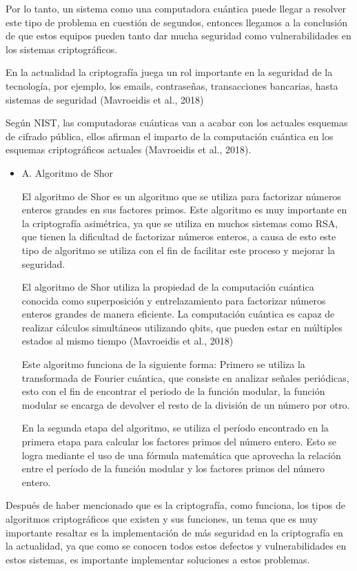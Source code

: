 \documentclass[twoside]{article}
\begin{document}
Por lo tanto, un sistema como una computadora cuántica puede llegar a resolver este tipo de problema en cuestión de segundos, entonces llegamos a la conclusión de que estos equipos pueden tanto dar mucha seguridad como vulnerabilidades en los sistemas criptográficos. 

En la actualidad la criptografía juega un rol importante en la seguridad de la tecnología, por ejemplo, los emails, contraseñas, transacciones bancarias, hasta sistemas de seguridad (Mavroeidis et al., 2018) 

Según NIST, las computadoras cuánticas van a acabar con los actuales esquemas de cifrado pública, ellos afirman el imparto de la computación cuántica en los esquemas criptográficos actuales (Mavroeidis et al., 2018). 

\begin{itemize}
    \item{A}. Algoritmo de Shor

        El algoritmo de Shor es un algoritmo que se utiliza para factorizar números enteros grandes en sus factores primos. Este algoritmo es muy importante en la criptografía asimétrica, ya que se utiliza en muchos sistemas como RSA, que tienen la dificultad de factorizar números enteros, a causa de esto este tipo de algoritmo se utiliza con el fin de facilitar este proceso y mejorar la seguridad. 

        El algoritmo de Shor utiliza la propiedad de la computación cuántica conocida como superposición y entrelazamiento para factorizar números enteros grandes de manera eficiente. La computación cuántica es capaz de realizar cálculos simultáneos utilizando qbits, que pueden estar en múltiples estados al mismo tiempo (Mavroeidis et al., 2018) 

        Este algoritmo funciona de la siguiente forma: Primero se utiliza la transformada de Fourier cuántica, que consiste en analizar señales periódicas, esto con el fin de encontrar el periodo de la función modular, la función modular se encarga de devolver el resto de la división de un número por otro. 

        En la segunda etapa del algoritmo, se utiliza el período encontrado en la primera etapa para calcular los factores primos del número entero. Esto se logra mediante el uso de una fórmula matemática que aprovecha la relación entre el período de la función modular y los factores primos del número entero. 
\end{itemize}

Después de haber mencionado que es la criptografía, como funciona, los tipos de algoritmos criptográficos que existen y sus funciones, un tema que es muy importante resaltar es la implementación de más seguridad en la criptografía en la actualidad, ya que como se conocen todos estos defectos y vulnerabilidades en estos sistemas, es importante implementar soluciones a estos problemas. 
\end{document}
